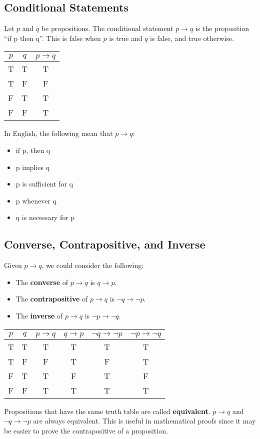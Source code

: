 \documentclass{math}
\begin{document}
\subsection*{Conditional Statements}
Let \( p \) and \( q \) be propositions. The conditional statement
\( p \to q \) is the proposition ``if p then q''. This is false when
\( p \) is true and \( q \) is false, and true otherwise.
\begin{center}
  \begin{tabular}{|c|c|c|}
    \hline
    \( p \) & \( q \) & \( p \to q \) \\ \hline
    T       & T       & T \\ \hline
    T       & F       & F \\ \hline
    F       & T       & T \\ \hline
    F       & F       & T \\ \hline
  \end{tabular}
\end{center}
In English, the following mean that \( p \to q \):
\begin{itemize}
  \item if p, then q
  \item p implies q
  \item p is sufficient for q
  \item p whenever q
  \item q is necessary for p
\end{itemize}

\subsection*{Converse, Contrapositive, and Inverse}
Given \( p \to q \), we could consider the following:
\begin{itemize}
  \item The \textbf{converse} of \( p \to q \) is \( q \to p \).
  \item The \textbf{contrapositive} of \( p \to q \) is
    \( \neg{q} \to \neg{p} \).
  \item The \textbf{inverse} of \( p \to q \) is
    \( \neg{p} \to \neg{q} \).
\end{itemize}
\begin{center}
  \begin{tabular}{|c|c|c|c|c|c|}
    \hline
    \( p \) & \( q \) & \( p \to q \) & \( q \to p \) &
      \( \neg{q} \to \neg{p} \) & \( \neg{p} \to \neg{q} \) \\ \hline
    T & T & T & T & T & T \\ \hline
    T & F & F & T & F & T \\ \hline
    F & T & T & F & T & F \\ \hline
    F & F & T & T & T & T \\ \hline
  \end{tabular}
\end{center}
Propositions that have the same truth table are called \textbf{equivalent}.
\( p \to q \) and \( \neg{q} \to \neg{p} \) are always equivalent.
This is useful in mathematical proofs since it may be easier to prove the
contrapositive of a proposition.
\end{document}
